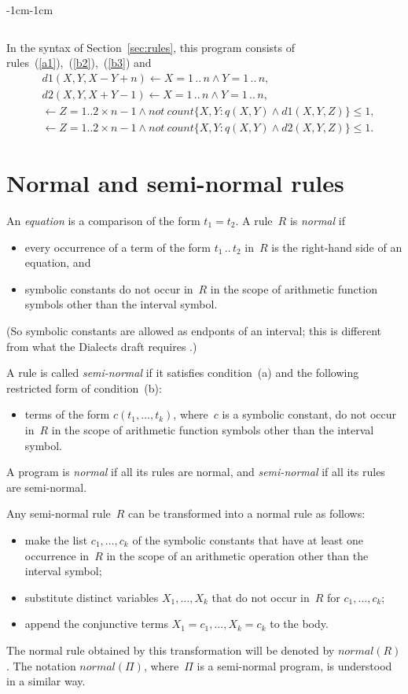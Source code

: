 \documentclass[11pt]{article}
\def\ar{\leftarrow}
\begin{document}
\begin{adjustwidth}{-1cm}{-1cm}
\begin{verbatim}
\end{verbatim}

In the syntax of Section~\ref{sec:rules}, this program consists of
rules~(\ref{a1}),~(\ref{b2}),~(\ref{b3}) and
\begin{align}
&d1(X,Y,X-Y+n) \ar X = 1\,..\,n\wedge Y = 1\,..\,n,\label{c4}\\
&d2(X,Y,X+Y-1) \ar X = 1\,..\,n\wedge Y = 1\,..\,n,\label{c5}\\
&\ar Z = 1..2\times n-1\wedge not\ count \{ X,Y: q(X,Y) \wedge d1(X,Y,Z) \} \leq 1,\label{c6}\\
&\ar Z = 1..2\times n-1\wedge not\ count   \{X,Y:  q(X,Y) \wedge d2(X,Y,Z) \} \leq 1.\label{c7}    
\end{align}

\section{Normal and semi-normal rules} \label{sec:normal}

An \emph{equation} is a comparison of the form $t_1=t_2$.
A rule~$R$ is \emph{normal} if
\begin{itemize}
\item[(a)]
  every occurrence of a term of the form $t_1\,..\,t_2$ in~$R$
is the right-hand side of an equation, and
\item[(b)]
  symbolic constants do not occur in~$R$ in the scope
  of arithmetic function symbols other than the interval symbol.
\end{itemize}
(So symbolic constants are allowed as endponts of an interval; this is
different from what the Dialects draft requires \cite[Section~3]{fan26b}.)

A rule is called {\em semi-normal} if it satisfies condition~(a) and the
following restricted form of condition~(b):
\begin{itemize}
\item[(b$'$)]
  terms of the form $c(t_1,\dots,t_k)$, where~$c$ is a symbolic constant,
  do not occur in~$R$ in the scope
  of arithmetic function symbols other than the interval symbol.
\end{itemize}

A program is \emph{normal} if all its rules are normal,
and \emph{semi-normal} if all its rules are semi-normal.

Any semi-normal rule~$R$ can be transformed into a normal rule as
follows:
\begin{itemize}
\item make the list $c_1,\dots,c_k$ of 
  the symbolic constants that have at least one occurrence in~$R$
  in the scope of an arithmetic operation other than the interval symbol;
\item substitute distinct variables $X_1,\dots,X_k$ that do not occur in~$R$
  for $c_1,\dots,c_k$;
\item append the conjunctive terms $X_1=c_1,\dots,X_k=c_k$ to the body.
\end{itemize}
The normal rule obtained by this transformation will be denoted by
$\mathit{normal}(R)$.  The notation $\mathit{normal}(\Pi)$, where~$\Pi$ is a
semi-normal program, is understood in a similar way.


\end{adjustwidth}
\end{document}
